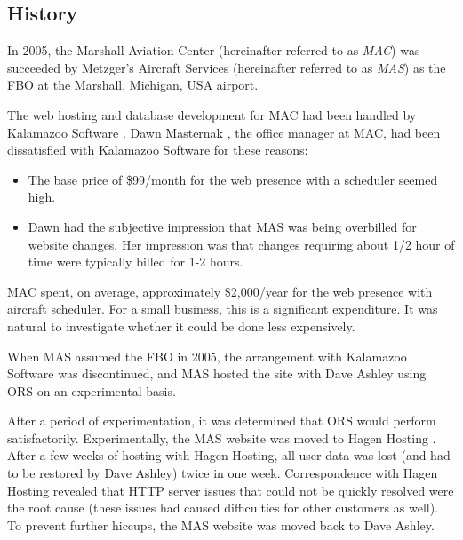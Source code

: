 \documentclass[letterpaper,10pt,titlepage]{article}
\begin{document}

\subsection{History}
\label{siov0:shis0}

In 2005, the Marshall Aviation Center
(hereinafter referred to as \emph{MAC}) was succeeded by
Metzger's Aircraft Services (hereinafter
referred to as \emph{MAS}) as the FBO at the Marshall,
Michigan, USA airport.

The web hosting and database development for MAC had been handled by
Kalamazoo Software \cite{bibref:com:kalsoft}\@.
Dawn Masternak \cite{bibref:i:masternakdawn}, 
the office manager at
MAC, had been dissatisfied with Kalamazoo Software for these reasons:

\begin{itemize}
\item The base price of \$99/month for the web presence with a scheduler
      seemed high.
\item Dawn had the subjective impression that MAS was being overbilled
      for website changes.  Her impression was that changes
      requiring about 1/2 hour of time were typically billed for 1-2 hours.
\end{itemize}

MAC spent, on average, approximately \$2,000/year for the web presence with
aircraft scheduler.  For a small
business, this is a significant expenditure.  It was natural to investigate
whether it could be done less expensively.

When MAS assumed the FBO in 2005, the arrangement with Kalamazoo Software was
discontinued, and MAS hosted the site with 
Dave Ashley \cite{bibref:i:ashleydavidt} using
ORS \cite{bibref:p:ors} on an experimental basis.

After a period of experimentation, it was determined that ORS would perform
satisfactorily.  Experimentally, the MAS website was moved to
Hagen Hosting \cite{bibref:hagenhostingweb}.  After
a few weeks of hosting with Hagen Hosting, all user data was lost (and had to
be restored by Dave Ashley) twice in one week.  Correspondence with
Hagen Hosting revealed that HTTP server issues that
could not be quickly resolved were the root cause (these issues
had caused difficulties for other customers as well).  To prevent further hiccups, the MAS
website was moved back to Dave Ashley.
\end{document}
